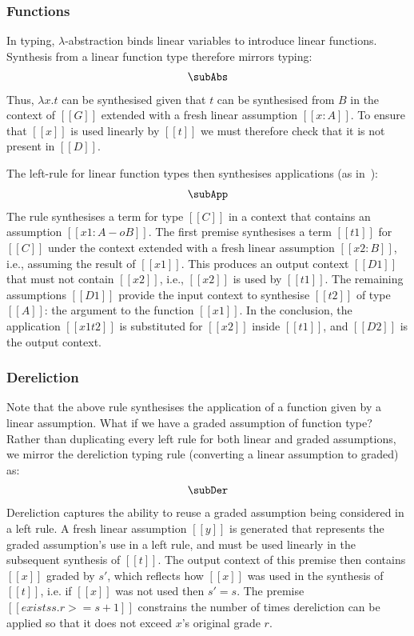   \subsubsection{Functions}
In typing, $\lambda$-abstraction binds linear variables to introduce
  linear functions. Synthesis from a linear function type therefore mirrors typing:
%
  \begin{align*}
\subAbs
    \end{align*}
%
  Thus, $\lambda x . t$ can be synthesised given that
  $t$ can be synthesised from $B$ in the context of $[[G]]$ extended with a fresh linear assumption $[[ x
  : A]]$. To ensure that $[[x]]$ is used linearly
  by $[[t]]$ we must therefore check that it is not present in
  $[[D]]$.

The left-rule for linear function types then synthesises applications
(as in~\cite{HODAS1994327}):
%
  \begin{align*}
    \subApp
    \end{align*}
%
  The rule synthesises a term for type $[[ C ]]$ in a context that
  contains an assumption $[[ x1 : A -o B ]]$.
%
  The first premise synthesises a term $[[t1]]$ for $[[C]]$ under the context
  extended with a fresh linear assumption $[[x2
  : B]]$, i.e., assuming the result of $[[ x1 ]]$. This produces an output context $[[D1]]$ that must not contain
  $[[x2]]$, i.e., $[[x2]]$ is used by $[[t1]]$. The remaining
  assumptions $[[D1]]$ provide the input context to
  synthesise $[[t2]]$ of type $[[A]]$: the argument to the function $[[x1]]$. In the conclusion,
  the application $[[x1 t2]]$ is substituted for $[[x2]]$ inside
  $[[t1]]$, and $[[D2]]$ is the output context.

\subsubsection{Dereliction} Note that the above rule synthesises the application of a
function given by a linear assumption. What if we have a graded
assumption of function type? Rather than duplicating every left rule
for both linear and graded assumptions, we mirror the
dereliction typing rule (converting a linear assumption to graded) as:
%
  \begin{align*}
    \subDer
    \end{align*}
%
Dereliction captures the ability to reuse a graded assumption being
considered in a left rule. A fresh linear assumption $[[y]]$ is generated that
represents the graded assumption's use in a left rule, and must be used
linearly in the subsequent synthesis of $[[t]]$. The output context of this premise then contains $[[x]]$ graded by $s'$, which reflects how $[[x]]$ was used in the synthesis of $[[t]]$, i.e. if $[[x]]$ was not used then $s' = s$. The premise $[[ exists s . r >= s + 1 ]]$ constrains the number of times dereliction can be applied so that it does not exceed $x$'s
original grade $r$.

